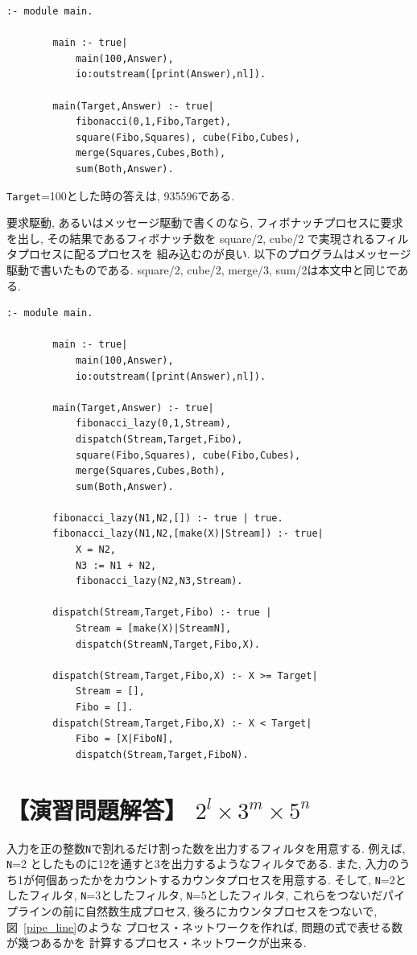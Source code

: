 \documentclass[a4,titlepage]{jsreport}
\newcounter{answer}
\newcommand{\answer}[1]{%
\section*{\refstepcounter{answer}【演習問題解答\arabic{answer}】 #1}}
\newenvironment{program}{\begin{quote}}{\end{quote}}
\begin{document}
\begin{Verbatim}[baselinestretch=0.8]
        :- module main.

        main :- true|
            main(100,Answer),
            io:outstream([print(Answer),nl]).

        main(Target,Answer) :- true|
            fibonacci(0,1,Fibo,Target),
            square(Fibo,Squares), cube(Fibo,Cubes),
            merge(Squares,Cubes,Both),
            sum(Both,Answer).
\end{Verbatim}

\verb!Target!=100とした時の答えは, 935596である.  

要求駆動, あるいはメッセージ駆動で書くのなら, 
フィボナッチプロセスに要求を出し, その結果であるフィボナッチ数を
square/2, cube/2 で実現されるフィルタプロセスに配るプロセスを
組み込むのが良い.  
以下のプログラムはメッセージ駆動で書いたものである.  
square/2, cube/2, merge/3, sum/2は本文中と同じである.  

\begin{Verbatim}[baselinestretch=0.8]
        :- module main.

        main :- true|
            main(100,Answer),
            io:outstream([print(Answer),nl]).

        main(Target,Answer) :- true|
            fibonacci_lazy(0,1,Stream),
            dispatch(Stream,Target,Fibo),
            square(Fibo,Squares), cube(Fibo,Cubes),
            merge(Squares,Cubes,Both),
            sum(Both,Answer).

        fibonacci_lazy(N1,N2,[]) :- true | true.
        fibonacci_lazy(N1,N2,[make(X)|Stream]) :- true|
            X = N2,
            N3 := N1 + N2,
            fibonacci_lazy(N2,N3,Stream).

        dispatch(Stream,Target,Fibo) :- true | 
            Stream = [make(X)|StreamN],
            dispatch(StreamN,Target,Fibo,X).

        dispatch(Stream,Target,Fibo,X) :- X >= Target|
            Stream = [],
            Fibo = [].
        dispatch(Stream,Target,Fibo,X) :- X < Target|
            Fibo = [X|FiboN],
            dispatch(Stream,Target,FiboN).
\end{Verbatim}

\answer{$2^{l} \times 3^{m} \times 5^{n}$}
入力を正の整数\verb!N!で割れるだけ割った数を出力するフィルタを用意する.  
例えば, \verb!N!=2 としたものに12を通すと3を出力するようなフィルタである.  
また, 入力のうち1が何個あったかをカウントするカウンタプロセスを用意する. 
そして, 
\verb!N!=2としたフィルタ, \verb!N!=3としたフィルタ, \verb!N!=5としたフィルタ, 
これらをつないだパイプラインの前に自然数生成プロセス, 
後ろにカウンタプロセスをつないで, 図~\ref{pipe_line}のような
プロセス・ネットワークを作れば, 問題の式で表せる数が幾つあるかを
計算するプロセス・ネットワークが出来る.  
\end{document}

